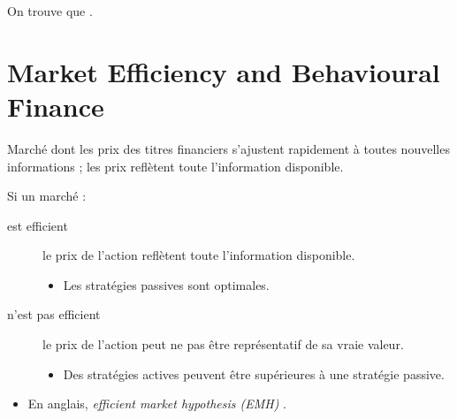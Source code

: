 \documentclass[10pt, french]{article}
\begin{document}
\begin{multicols*}{2}
\begin{definitionNOHFILL}[Notation]
On trouve que 	.
\end{definitionNOHFILL}



\newpage
\setcounter{section}{38} %
\section{Market Efficiency and Behavioural Finance}
\begin{definitionNOHFILL}
Marché dont les prix des titres financiers s'ajustent rapidement à toutes nouvelles informations ; les prix reflètent toute l'information disponible.


Si un marché :
\begin{description}
	\item[est efficient]	le prix de l'action reflètent toute l'information disponible.
		\begin{itemize}
		\item	Les stratégies passives sont optimales.
		\end{itemize}
	\item[n'est pas efficient]	le prix de l'action peut ne pas être représentatif de sa vraie valeur.
		\begin{itemize}
		\item	Des stratégies actives peuvent être supérieures à une stratégie passive.
		\end{itemize}
\end{description}

\begin{itemize}
	\item	En anglais, \og \textit{efficient market hypothesis (EMH)} \fg{}.
\end{itemize}
\end{definitionNOHFILL}



\end{multicols*}
\end{document}
